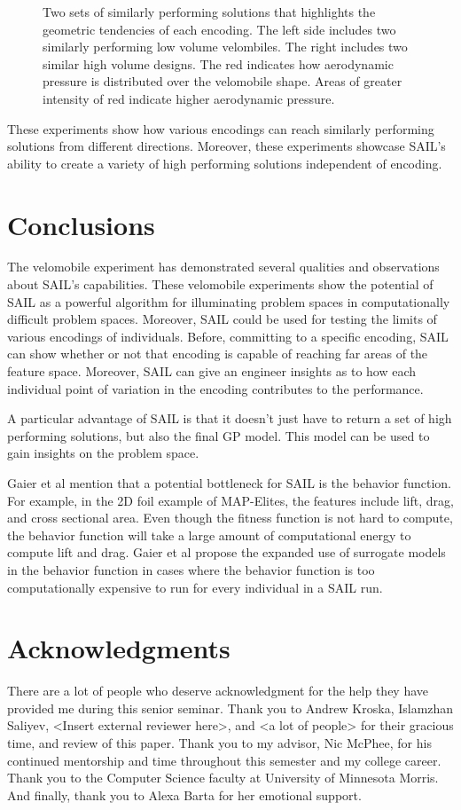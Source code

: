\documentclass{sig-alternate}
\begin{document}
\begin{figure}[htb]
\centering
{}
\label{fig:3DShapes}
\caption{Two sets of similarly performing solutions that highlights the geometric tendencies of each encoding.
The left side includes two similarly performing low volume velombiles.
The right includes two similar high volume designs.
The red indicates how aerodynamic pressure is distributed over the velomobile shape.
Areas of greater intensity of red indicate higher aerodynamic pressure.}
\end{figure}

These experiments show how various encodings can reach similarly performing solutions from different directions.
Moreover, these experiments showcase SAIL's ability to create a variety of high performing solutions independent of encoding.

\section{Conclusions}
\label{sec:conclusions}
The velomobile experiment has demonstrated several qualities and observations about SAIL’s capabilities.
These velomobile experiments show the potential of SAIL as a powerful algorithm for illuminating problem spaces in computationally difficult problem spaces.
Moreover, SAIL could be used for testing the limits of various encodings of individuals.
Before, committing to a specific encoding, SAIL can show whether or not that encoding is capable of reaching far areas of the feature space.
Moreover, SAIL can give an engineer insights as to how each individual point of variation in the encoding contributes to the performance. 

A particular advantage of SAIL is that it doesn’t just have to return a set of high performing solutions, but also the final GP model.
This model can be used to gain insights on the problem space.

Gaier et al mention that a potential bottleneck for SAIL is the behavior function.
For example, in the 2D foil example of MAP-Elites, the features include lift, drag, and cross sectional area.
Even though the fitness function is not hard to compute, the behavior function will take a large amount of computational energy to compute lift and drag.
Gaier et al propose the expanded use of surrogate models in the behavior function in cases where the behavior function is too computationally expensive to run for every individual in a SAIL run.

\section*{Acknowledgments}
There are a lot of people who deserve acknowledgment for the help they have provided me during this senior seminar. Thank you to Andrew Kroska, Islamzhan Saliyev, <Insert external reviewer here>, and <a lot of people> for their gracious time, and review of this paper.
Thank you to my advisor, Nic McPhee, for his continued mentorship and time throughout this semester and my college career.
Thank you to the Computer Science faculty at University of Minnesota Morris.
And finally, thank you to Alexa Barta for her emotional support.
\label{sec:acknowledgments}
\end{document}
